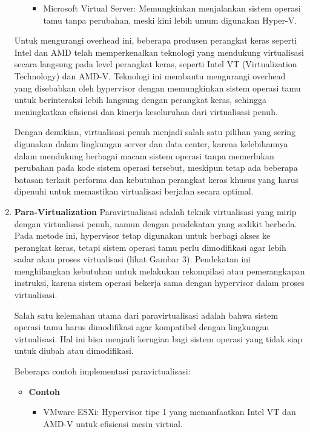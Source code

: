 \documentclass[12pt]{article}
\begin{document}
\begin{enumerate}
\begin{itemize}
\begin{itemize}
            \item Microsoft Virtual Server: Memungkinkan menjalankan sistem operasi tamu tanpa perubahan, meski kini lebih umum digunakan Hyper-V.
        \end{itemize}
    \end{itemize}
    Untuk mengurangi overhead ini, beberapa produsen perangkat keras seperti Intel dan AMD telah memperkenalkan teknologi yang mendukung virtualisasi secara langsung pada level perangkat keras, seperti Intel VT (Virtualization Technology) dan AMD-V. Teknologi ini membantu mengurangi overhead yang disebabkan oleh hypervisor dengan memungkinkan sistem operasi tamu untuk berinteraksi lebih langsung dengan perangkat keras, sehingga meningkatkan efisiensi dan kinerja keseluruhan dari virtualisasi penuh.
    
    \par Dengan demikian, virtualisasi penuh menjadi salah satu pilihan yang sering digunakan dalam lingkungan server dan data center, karena kelebihannya dalam mendukung berbagai macam sistem operasi tanpa memerlukan perubahan pada kode sistem operasi tersebut, meskipun tetap ada beberapa batasan terkait performa dan kebutuhan perangkat keras khusus yang harus dipenuhi untuk memastikan virtualisasi berjalan secara optimal.

    \item \textbf{Para-Virtualization}
    \newline Paravirtualisasi adalah teknik virtualisasi yang mirip dengan virtualisasi penuh, namun dengan pendekatan yang sedikit berbeda. Pada metode ini, hypervisor tetap digunakan untuk berbagi akses ke perangkat keras, tetapi sistem operasi tamu perlu dimodifikasi agar lebih sadar akan proses virtualisasi (lihat Gambar 3). Pendekatan ini menghilangkan kebutuhan untuk melakukan rekompilasi atau pemerangkapan instruksi, karena sistem operasi bekerja sama dengan hypervisor dalam proses virtualisasi.

    \par Salah satu kelemahan utama dari paravirtualisasi adalah bahwa sistem operasi tamu harus dimodifikasi agar kompatibel dengan lingkungan virtualisasi. Hal ini bisa menjadi kerugian bagi sistem operasi yang tidak siap untuk diubah atau dimodifikasi. 
    
    \par Beberapa contoh implementasi paravirtualisasi:
    \begin{itemize}
        \item \textbf{Contoh}
        \begin{itemize}
            \item VMware ESXi: Hypervisor tipe 1 yang memanfaatkan Intel VT dan AMD-V untuk efisiensi mesin virtual.


\end{itemize}
\end{itemize}
\end{enumerate}
\end{document}
